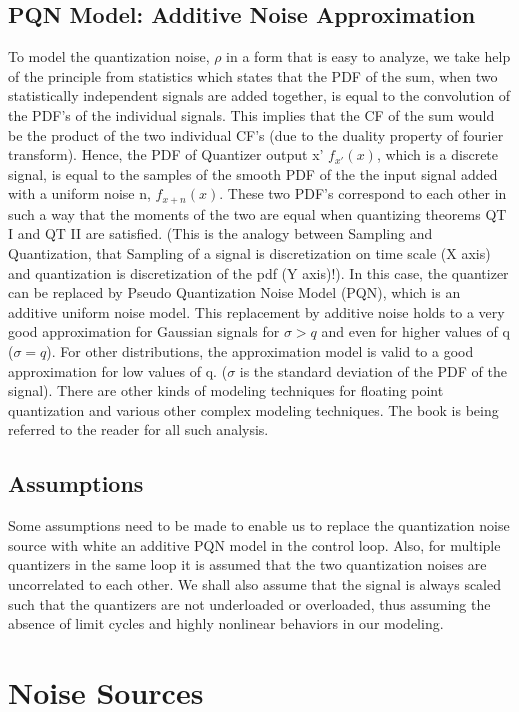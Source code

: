 \documentclass[a4paper,12pt]{article}
\begin{document}
\subsection{PQN Model: Additive Noise Approximation} To model the quantization noise, $\rho$ in a form that is easy to analyze, we take help of the principle from statistics which states that the PDF of the sum, when two statistically independent signals are added together, is equal to the convolution of the PDF's of the individual signals. This implies that the CF of the sum would be the product of the two individual CF's (due to the duality property of fourier transform).
Hence, the PDF of Quantizer output x' $f_{x'}(x)$, which is a discrete signal, is equal to the samples of the smooth PDF of the the input signal added with a uniform noise n, $f_{x+n}(x)$. These two PDF's correspond to each other in such a way that the moments of the two are equal when quantizing theorems QT I and QT II are satisfied. (This is the analogy between Sampling and Quantization, that Sampling of a signal is discretization on time scale (X axis) and quantization is discretization of the pdf (Y axis)!). In this case, the quantizer can be replaced by Pseudo Quantization Noise Model (PQN), which is an additive uniform noise model. This replacement by additive noise holds to a very good approximation for Gaussian signals for $\sigma > q$ and even for higher values of q ($\sigma = q$). For other distributions, the approximation model is valid to a good approximation for low values of q. ($\sigma$ is the standard deviation of the PDF of the signal). There are other kinds of modeling techniques for floating point quantization and various other complex modeling techniques. The book \cite{Kollar} is being referred to the reader for all such analysis.
	\subsection{Assumptions}
Some assumptions need to be made to enable us to replace the quantization noise source with white an additive PQN model in the control loop. Also, for multiple quantizers in the same loop it is assumed that the two quantization noises are uncorrelated to each other.
We shall also assume that the signal is always scaled such that the quantizers are not underloaded or overloaded, thus assuming the absence of limit cycles and highly nonlinear behaviors in our modeling.


\section{Noise Sources}
\end{document}
